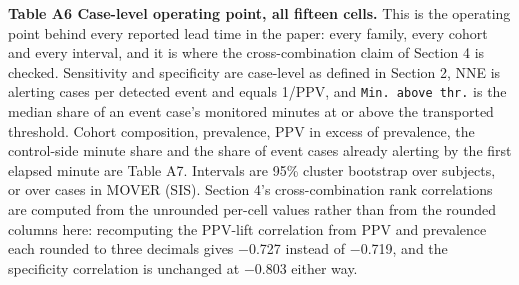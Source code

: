 \begin{minipage}{\linewidth}
\textbf{Table A6 \textbar{} Case-level operating point, all fifteen cells.} This is the operating point behind every reported lead time in the paper: every family, every cohort and every interval, and it is where the cross-combination claim of Section 4 is checked. Sensitivity and specificity are
case-level as defined in Section 2, NNE is alerting cases per detected event and equals 1/PPV, and
\texttt{Min.\ above\ thr.} is the median share of an event case's monitored minutes at or above the
transported threshold. Cohort composition, prevalence, PPV in excess of prevalence, the
control-side minute share and the share of event cases already alerting by the first elapsed
minute are Table A7. Intervals are 95\% cluster bootstrap over subjects, or over cases in MOVER
(SIS). Section 4's cross-combination rank correlations are computed from the
unrounded per-cell values rather than from the rounded columns here: recomputing the PPV-lift
correlation from PPV and prevalence each rounded to three decimals gives $-$0.727 instead of
$-$0.719, and the specificity correlation is unchanged at $-$0.803 either way.


\end{minipage}
